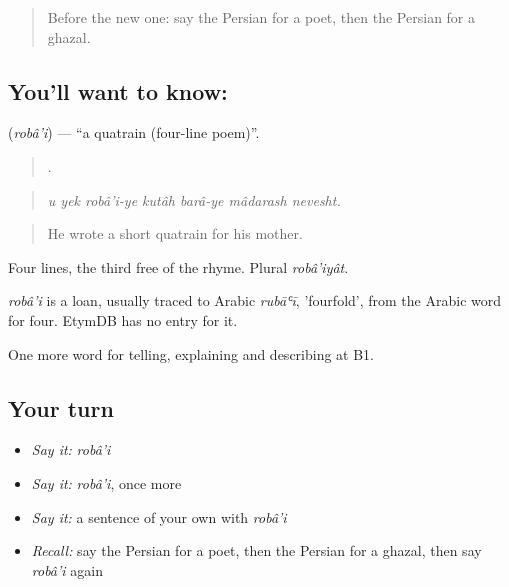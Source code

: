 \label{lesson:FA-C521-robai}



\begin{quote}
Before the new one: say the Persian for a poet, then the Persian for a ghazal.
\end{quote}

\subsection*{You'll want to know: }
\textbf{} (\emph{robâ'i}) — \textquotedblleft{}a quatrain (four-line poem)\textquotedblright{}.

\begin{quote}
      .
\end{quote}

\begin{quote}
\emph{u yek robâ'i-ye kutâh barâ-ye mâdarash nevesht.}
\end{quote}

\begin{quote}
He wrote a short quatrain for his mother.
\end{quote}

Four lines, the third free of the rhyme. Plural \emph{robâ'iyât}.

\begin{cousinweb}
\emph{robâ'i} is a loan, usually traced to Arabic \emph{rubāʿī}, 'fourfold', from the Arabic word for four. EtymDB has no entry for it.
\end{cousinweb}

\begin{grammarlens}[title={What you've built}]
One more word for telling, explaining and describing at B1.
\end{grammarlens}

\subsection*{Your turn}
\begin{itemize}
\raggedright
  \item \emph{Say it:} \emph{robâ'i}
  \item \emph{Say it:} \emph{robâ'i}, once more
  \item \emph{Say it:} a sentence of your own with \emph{robâ'i}
  \item \emph{Recall:} say the Persian for a poet, then the Persian for a ghazal, then say \emph{robâ'i} again
\end{itemize}

